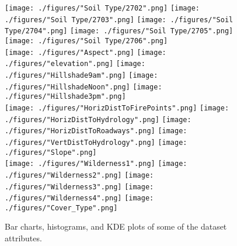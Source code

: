 \documentclass[10pt, conference, compsocconf]{IEEEtran}
\begin{document}
\begin{figure*}[ht]
	\vspace{-2mm}
	\centering
	\texttt{[image: ./figures/"Soil Type/2702".png]}
	\texttt{[image: ./figures/"Soil Type/2703".png]}
	\texttt{[image: ./figures/"Soil Type/2704".png]}
	\texttt{[image: ./figures/"Soil Type/2705".png]}
	\texttt{[image: ./figures/"Soil Type/2706".png]}\\
	
	\centering	
	\texttt{[image: ./figures/"Aspect".png]}
	\texttt{[image: ./figures/"elevation".png]}
	\texttt{[image: ./figures/"Hillshade9am".png]}
	\texttt{[image: ./figures/"HillshadeNoon".png]}
	\texttt{[image: ./figures/"Hillshade3pm".png]}\\
	
	\centering
	\texttt{[image: ./figures/"HorizDistToFirePoints".png]}
	\texttt{[image: ./figures/"HorizDistToHydrology".png]}
	\texttt{[image: ./figures/"HorizDistToRoadways".png]}
	\texttt{[image: ./figures/"VertDistToHydrology".png]}
	\texttt{[image: ./figures/"Slope".png]}\\
	
		\centering
	\texttt{[image: ./figures/"Wilderness1".png]}
	\texttt{[image: ./figures/"Wilderness2".png]}
	\texttt{[image: ./figures/"Wilderness3".png]}
	\texttt{[image: ./figures/"Wilderness4".png]}
	\texttt{[image: ./figures/"Cover\_Type".png]}\\
	
	\caption{Bar charts, histograms, and KDE plots of some of the dataset attributes.}
	\label{fig1}
\end{figure*}
\end{document}
